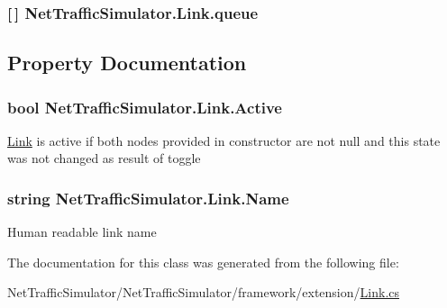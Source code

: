 \hypertarget{classNetTrafficSimulator_1_1Link_a0a9c8700a5fe5e22d7091587319886aa}{
\subsubsection[{queue}]{ \mbox{[}$\,$\mbox{]} Net\-Traffic\-Simulator.\-Link.\-queue\hspace{0.3cm}{\ttfamily [private]}}}\label{classNetTrafficSimulator_1_1Link_a0a9c8700a5fe5e22d7091587319886aa}


\subsection{Property Documentation}
\hypertarget{classNetTrafficSimulator_1_1Link_af5dbc33cd8e78697ce401ad2520877e8}{
\subsubsection[{Active}]{\setlength{\rightskip}{0pt plus 5cm}bool Net\-Traffic\-Simulator.\-Link.\-Active\hspace{0.3cm}{\ttfamily [get]}}}\label{classNetTrafficSimulator_1_1Link_af5dbc33cd8e78697ce401ad2520877e8}
\hyperlink{classNetTrafficSimulator_1_1Link}{Link} is active if both nodes provided in constructor are not null and this state was not changed as result of toggle \hypertarget{classNetTrafficSimulator_1_1Link_ac6510bbaac975c237d4dab9b492b5cfe}{
\subsubsection[{Name}]{\setlength{\rightskip}{0pt plus 5cm}string Net\-Traffic\-Simulator.\-Link.\-Name\hspace{0.3cm}{\ttfamily [get]}}}\label{classNetTrafficSimulator_1_1Link_ac6510bbaac975c237d4dab9b492b5cfe}
Human readable link name 

The documentation for this class was generated from the following file\-:\begin{DoxyCompactItemize}
\item 
Net\-Traffic\-Simulator/\-Net\-Traffic\-Simulator/framework/extension/\hyperlink{Link_8cs}{Link.\-cs}\end{DoxyCompactItemize}
